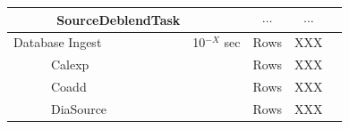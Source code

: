 \documentclass[12pt]{article}
\begin{document}
\begin{table}[h]
\begin{center}
\begin{tabular}{lcccc}
~~~~~~SourceDeblendTask       &               & $\cdots$     & $\cdots$        &           \\
\hline
Database Ingest               & 10$^{-X}$ sec & Rows         & XXX             &           \\
~~~~~~Calexp                  &               & Rows         & XXX             &           \\
~~~~~~Coadd                   &               & Rows         & XXX             &           \\
~~~~~~DiaSource               &               & Rows         & XXX             &           \\
\hline
\hline
\end{tabular}
\end{center}
\end{table}

\end{document}
